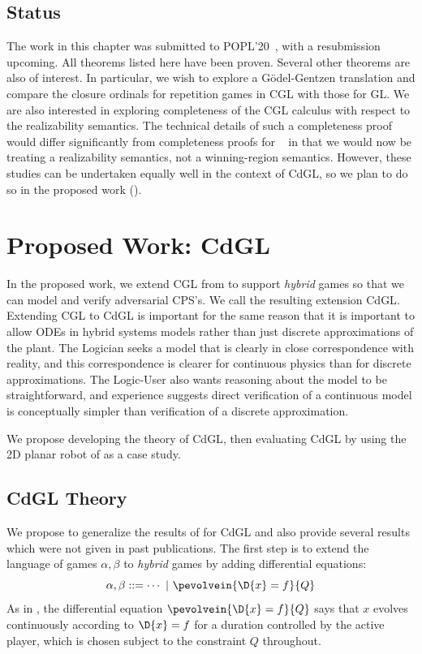 \documentclass[12pt]{cmuthesis}
\theoremstyle{definition}
\theoremstyle{remark}
\newcommand{\ivr}{Q}
\newcommand{\rref}[2][]{\prettyref{#2}}
\newcommand{\CGL}{\textsf{CGL}\xspace}
\newcommand{\CdGL}{\textsf{CdGL}\xspace}
\newcommand{\GL}{GL\xspace}
\begin{document}
\section{Status}
The work in this chapter was submitted to POPL'20~\cite{poplcgl}, with a resubmission upcoming.
All theorems listed here have been proven.
Several other theorems are also of interest.
In particular, we wish to explore a G\"{o}del-Gentzen translation and compare the closure ordinals for repetition games in \CGL with those for \GL.
We are also interested in exploring completeness of the \CGL calculus with respect to the realizability semantics.
The technical details of such a completeness proof would differ significantly from completeness proofs for \dGL~\cite{DBLP:journals/tocl/Platzer17} in that we would now be treating a realizability semantics, not a winning-region semantics.
However, these studies can be undertaken equally well in the context of \CdGL, so we plan to do so in the proposed work (\rref{ch:cdgl}).

\chapter{Proposed Work: \CdGL}
\label{ch:cdgl}
In the proposed work, we extend \CGL from \rref{ch:cgl} to support \emph{hybrid} games so that we can model and verify adversarial CPS's.
We call the resulting extension \CdGL.
Extending \CGL to \CdGL is important for the same reason that it is important to allow ODEs in hybrid systems models rather than just discrete approximations of the plant.
The Logician seeks a model that is clearly in close correspondence with reality, and this correspondence is clearer for continuous physics than for discrete approximations.
The Logic-User also wants reasoning about the model to be straightforward, and experience suggests direct verification of a continuous model is conceptually simpler than verification of a discrete approximation.

We propose developing the theory of \CdGL, then evaluating \CdGL by using the 2D planar robot of \rref{sec:ground-robotics} as a case study.

\section{\CdGL Theory}
We propose to generalize the results of \rref{ch:cgl} for \CdGL and also provide several results which were not given in past publications.
The first step is to extend the language of games $\alpha,\beta$ to \emph{hybrid} games by adding differential equations:
\[\alpha,\beta ::= \cdots\ |\ \pevolvein{\D{x}=f}{\ivr}\]
As in \dGL, the differential equation $\pevolvein{\D{x}=f}{\ivr}$ says that $x$ evolves continuously according to $\D{x}=f$ for a duration controlled by the active player, which is chosen subject to the constraint $\ivr$ throughout.
\end{document}
